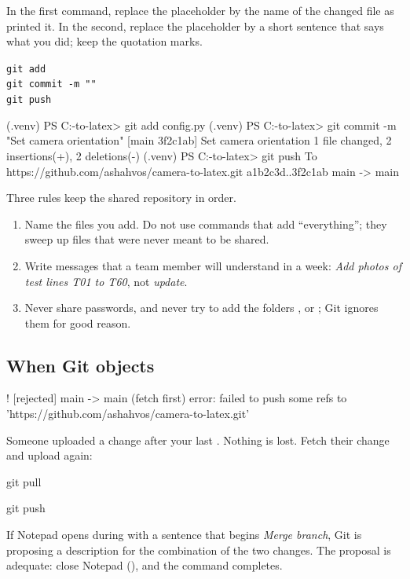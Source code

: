 In the first command, replace the placeholder by the name of the changed file as  printed it. In the second, replace the placeholder by a short sentence that says what
you did; keep the quotation marks.
\begin{center}
\texttt{git add }\\[4pt]
\texttt{git commit -m "}\texttt{"}\\[4pt]
\texttt{git push}
\end{center}
\begin{out}
(.venv) PS C:\camera-to-latex> git add config.py
(.venv) PS C:\camera-to-latex> git commit -m "Set camera orientation"
[main 3f2c1ab] Set camera orientation
 1 file changed, 2 insertions(+), 2 deletions(-)
(.venv) PS C:\camera-to-latex> git push
To https://github.com/ashahvos/camera-to-latex.git
   a1b2c3d..3f2c1ab  main -> main
\end{out}

Three rules keep the shared repository in order.
\begin{enumerate}
\item Name the files you add. Do not use commands that add ``everything''; they sweep up files
  that were never meant to be shared.
\item Write messages that a team member will understand in a week: \emph{Add photos of test
  lines T01 to T60}, not \emph{update}.
\item Never share passwords, and never try to add the folders ,  or
  ; Git ignores them for good reason.
\end{enumerate}

\subsection{When Git objects}

\begin{out}
 ! [rejected]        main -> main (fetch first)
error: failed to push some refs to 'https://github.com/ashahvos/camera-to-latex.git'
\end{out}
Someone uploaded a change after your last . Nothing is lost. Fetch their change
and upload again:
\begin{ps}
git pull
\end{ps}
\begin{ps}
git push
\end{ps}
If Notepad opens during  with a sentence that begins \emph{Merge branch}, Git is
proposing a description for the combination of the two changes. The proposal is adequate: close
Notepad (\then{}), and the command completes.

